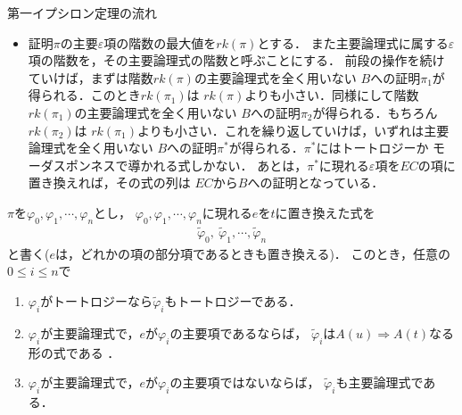\begin{itembox}[l]{第一イプシロン定理の流れ}
\begin{itemize}
			\item 証明$\pi$の主要$\varepsilon$項の階数の最大値を$rk(\pi)$とする．
				また主要論理式に属する$\varepsilon$項の階数を，その主要論理式の階数と呼ぶことにする．
				前段の操作を続けていけば，まずは階数$rk(\pi)$の主要論理式を全く用いない
				$B$への証明$\pi_{1}$が得られる．このとき$rk(\pi_{1})$は
				$rk(\pi)$よりも小さい．同様にして階数$rk(\pi_{1})$の主要論理式を全く用いない
				$B$への証明$\pi_{2}$が得られる．もちろん$rk(\pi_{2})$は
				$rk(\pi_{1})$よりも小さい．これを繰り返していけば，いずれは主要論理式を全く用いない
				$B$への証明$\pi^{\ast}$が得られる．$\pi^{\ast}$にはトートロジーか
				モーダスポンネスで導かれる式しかない．
				あとは，$\pi^{\ast}$に現れる$\varepsilon$項を$EC$の項に置き換えれば，その式の列は
				$EC$から$B$への証明となっている．
		\end{itemize}
	\end{itembox}
	
	$\pi$を$\varphi_{0},\varphi_{1},\cdots,\varphi_{n}$とし，
	$\varphi_{0},\varphi_{1},\cdots,\varphi_{n}$に現れる$e$を$t$に置き換えた式を
	\begin{align}
		\tilde{\varphi}_{0},\ \tilde{\varphi}_{1},\cdots, \tilde{\varphi}_{n}
	\end{align}
	と書く($e$は，どれかの項の部分項であるときも置き換える)．
	このとき，任意の$0 \leq i \leq n$で
	\begin{enumerate}
		\item $\varphi_{i}$がトートロジーなら$\tilde{\varphi}_{i}$もトートロジーである．
		\item $\varphi_{i}$が主要論理式で，$e$が$\varphi_{i}$の主要項であるならば，
			$\tilde{\varphi}_{i}$は$A(u) \Longrightarrow A(t)$なる形の式である
			\footnotemark．
		\item $\varphi_{i}$が主要論理式で，$e$が$\varphi_{i}$の主要項ではないならば，
			$\tilde{\varphi}_{i}$も主要論理式である．
	\end{enumerate}
	
	
